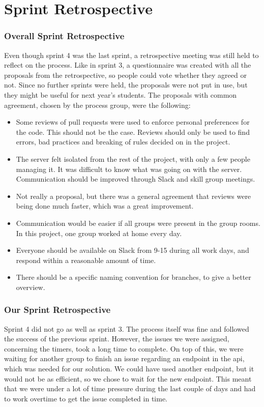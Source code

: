 \section{Sprint Retrospective}

\subsubsection{Overall Sprint Retrospective}
Even though sprint 4 was the last sprint, a retrospective meeting was still held to reflect on the process. Like in sprint 3, a questionnaire was created with all the proposals from the retrospective, so people could vote whether they agreed or not. Since no further sprints were held, the proposals were not put in use, but they might be useful for next year's students. The proposals with common agreement, chosen by the process group, were the following:
\begin{itemize}
    \item Some reviews of pull requests were used to enforce personal preferences for the code. This should not be the case. Reviews should only be used to find errors, bad practices and breaking of rules decided on in the project.
    \item The server felt isolated from the rest of the project, with only a few people managing it. It was difficult to know what was going on with the server. Communication should be improved through Slack and skill group meetings.
    \item Not really a proposal, but there was a general agreement that reviews were being done much faster, which was a great improvement. 
    \item Communication would be easier if all groups were present in the group rooms. In this project, one group worked at home every day.
    \item Everyone should be available on Slack from 9-15 during all work days, and respond within a reasonable amount of time.
    \item There should be a specific naming convention for branches, to give a better overview.
\end{itemize}

\subsubsection{Our Sprint Retrospective}
Sprint 4 did not go as well as sprint 3. The process itself was fine and followed the success of the previous sprint. However, the issues we were assigned, concerning the timers, took a long time to complete. On top of this, we were waiting for another group to finish an issue regarding an endpoint in the api, which was needed for our solution. We could have used another endpoint, but it would not be as efficient, so we chose to wait for the new endpoint. This meant that we were under a lot of time pressure during the last couple of days and had to work overtime to get the issue completed in time. 

